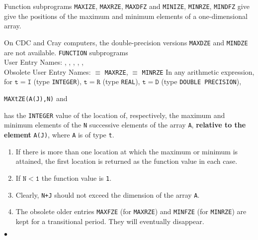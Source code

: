                        
      
\Submitter{}                            
                      
Function subprograms {\tt MAXIZE}, {\tt MAXRZE}, {\tt MAXDFZ} and
{\tt MINIZE}, {\tt MINRZE}, {\tt MINDFZ} give give the positions of
the maximum and minimum elements of a one-dimensional array.
\par
On CDC and Cray computers, the double-precision versions
{\tt MAXDZE} and {\tt MINDZE} are not available.
\Structure
{\tt FUNCTION} subprograms \\
User Entry Names: , , ,
                  , ,  \\
Obsolete User Entry Names:  $\equiv$ {\tt MAXRZE},
                            $\equiv$ {\tt MINRZE}
\Usage
In any arithmetic expression, for $\mathtt{t=I}$ (type {\tt INTEGER}),
$\mathtt{t=R}$ (type {\tt REAL}), $\mathtt{t=D}$
(type {\tt DOUBLE PRECISION}),
\begin{center}
{\tt MAXtZE(A(J),N)} \qquad and 
\end{center}
has the {\tt INTEGER} value of the location of, respectively,
the maximum and minimum elements of the {\tt N} successive elements of
the array {\tt A}, {\bf relative to the element} {\tt A(J)}, where
{\tt A} is of type {\tt t}.
\Notes
\begin{enumerate}
\item If there is more than one location at which the maximum or
minimum is attained, the first location is returned as the function
value in each case.
\item If $\mathtt{N < 1}$ the function value is {\tt 1}.
\item Clearly, {\tt N+J} should not exceed the dimension of the array
{\tt A}.
\item The obsolete older entries {\tt MAXFZE} (for {\tt MAXRZE}) and
{\tt MINFZE} (for {\tt MINRZE}) are kept for a transitional period.
They will eventually disappear.
\end{enumerate}
$\bullet$
